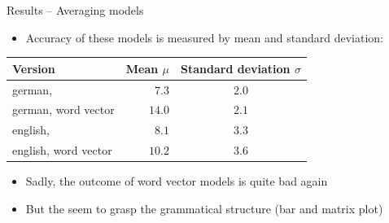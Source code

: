 \begin{frame}{Results – Averaging models}
    \begin{itemize}
        \item<+-> Accuracy of these models is measured by mean and standard deviation:
    \end{itemize}
    \begin{table}
        \centering
        \begin{tabular}{lrc}
            \toprule
            Version					& Mean $ \mu $		& Standard deviation $ \sigma $ \\
            \midrule
            german, \onehot{} 		& $ 7.3 $	& $ 2.0 $ \\%
            german, word vector		& $ 14.0 $	& $ 2.1 $ \\%
            english, \onehot{}		& $ 8.1 $	& $ 3.3 $ \\%
            english, word vector	& $ 10.2 $	& $ 3.6 $ \\%
            \bottomrule
        \end{tabular}
        \label{tab: avg model versions and metrics}
    \end{table}
    \hfill{}
    \begin{itemize}
        \item<+-> Sadly, the outcome of word vector models is quite bad again %
        \item<+-> But the  seem to grasp the grammatical structure (bar and matrix plot)
    \end{itemize}
\end{frame}
